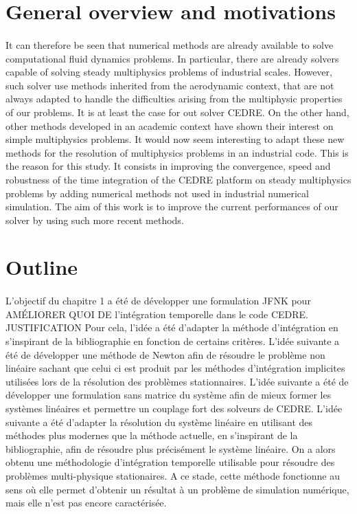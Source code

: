   \section*{General overview and motivations}

    \paragraph{}
    It can therefore be seen that numerical methods are already available to solve computational fluid dynamics problems.
    In particular, there are already solvers capable of solving steady multiphysics problems of industrial scales.
    However, such solver use methods inherited from the aerodynamic context, that are not always adapted to handle the difficulties arising from the multiphysic properties of our problems.
    It is at least the case for out solver CEDRE.
    On the other hand, other methods developed in an academic context have shown their interest on simple multiphysics problems.
    It would now seem interesting to adapt these new methods for the resolution of multiphysics problems in an industrial code.
    This is the reason for this study.
    It consists in improving the convergence, speed and robustness of the time integration of the CEDRE platform on steady multiphysics problems by adding numerical methods not used in industrial numerical simulation.
    The aim of this work is to improve the current performances of our solver by using such more recent methods.


  \section*{Outline}

    \paragraph{}
    L'objectif du chapitre 1 a été de développer une formulation JFNK pour AMÉLIORER QUOI DE l'intégration temporelle dans le code CEDRE.
    JUSTIFICATION
    Pour cela, l'idée a été d'adapter la méthode d'intégration en s'inspirant de la bibliographie en fonction de certains critères.
    L'idée suivante a été de développer une méthode de Newton afin de résoudre le problème non linéaire sachant que celui ci est produit par les méthodes d'intégration implicites utilisées lors de la résolution des problèmes stationnaires.
    L'idée suivante a été de développer une formulation sans matrice du système afin de mieux former les systèmes linéaires et permettre un couplage fort des solveurs de CEDRE.
    L'idée suivante a été d'adapter la résolution du système linéaire en utilisant des méthodes plus modernes que la méthode actuelle, en s'inspirant de la bibliographie, afin de résoudre plus précisément le système linéaire.
    On a alors obtenu une méthodologie d'intégration temporelle utilisable pour résoudre des problèmes multi-physique stationaires.
    A ce stade, cette méthode fonctionne au sens où elle permet d'obtenir un résultat à un problème de simulation numérique, mais elle n'est pas encore caractérisée.

